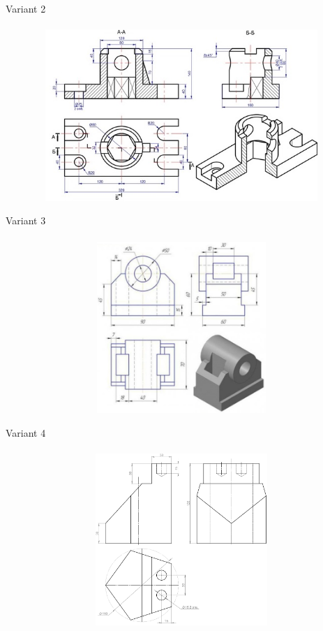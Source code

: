 \documentclass[aspectratio=169]{beamer}
\begin{document}
\begin{frame}[t]{Variant 2}
    \framesubtitle{}
    \vspace{-0.5cm}
    \begin{figure}[H]
        \centering\includegraphics[height=6.5cm,width=1\textwidth,keepaspectratio]{2_new.jpg}
        \label{fig:2_new.jpg}
    \end{figure}
\end{frame}


\begin{frame}[t]{Variant 3}
    \framesubtitle{}
    \vspace{-0.5cm}
    \begin{figure}[H]
        \centering\includegraphics[height=6.5cm,width=1\textwidth,keepaspectratio]{3.jpg}
        \label{fig:3.jpg}
    \end{figure}
\end{frame}

\begin{frame}[t]{Variant 4}
    \framesubtitle{}
    \vspace{-0.5cm}
    \begin{figure}[H]
        \centering\includegraphics[height=6.5cm,width=1\textwidth,keepaspectratio]{4.png}
        \label{fig:4.png}
    \end{figure}
\end{frame}
\end{document}
